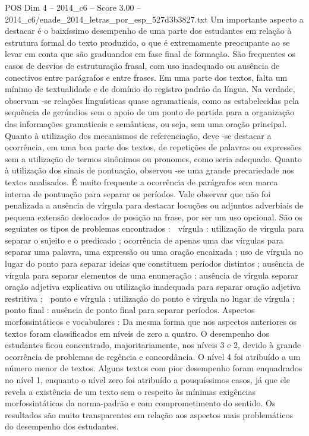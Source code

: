 \begin{textsample}{POS Dim 4 – 2014\_c6 – Score 3.00 – 2014\_c6/enade\_2014\_letras\_por\_esp\_527d3b3827.txt}
Um importante aspecto a destacar é o baixíssimo desempenho de uma parte dos estudantes em relação à estrutura formal do texto produzido, o que é extremamente preocupante ao se levar em conta que são graduandos em fase final de formação.
São frequentes os casos de desvios de estruturação frasal, com uso inadequado ou ausência de conectivos entre parágrafos e entre frases.
Em uma parte dos textos, falta um mínimo de textualidade e de domínio do registro padrão da língua.
Na verdade, observam -se relações linguísticas quase agramaticais, como as estabelecidas pela sequência de gerúndios sem o apoio de um ponto de partida para a organização das informações gramaticais e semânticas, ou seja, sem uma oração principal.
Quanto à utilização dos mecanismos de referenciação, deve -se destacar a ocorrência, em uma boa parte dos textos, de repetições de palavras ou expressões sem a utilização de termos sinônimos ou pronomes, como seria adequado.
Quanto à utilização dos sinais de pontuação, observou -se uma grande precariedade nos textos analisados.
É muito frequente a ocorrência de parágrafos sem marca interna de pontuação para separar os períodos.
Vale observar que não foi penalizada a ausência de vírgula para destacar locuções ou adjuntos adverbiais de pequena extensão deslocados de posição na frase, por ser um uso opcional.
São os seguintes os tipos de problemas encontrados :  vírgula : utilização de vírgula para separar o sujeito e o predicado ; ocorrência de apenas uma das vírgulas para separar uma palavra, uma expressão ou uma oração encaixada ; uso de vírgula no lugar do ponto para separar ideias que constituem períodos distintos ; ausência de vírgula para separar elementos de uma enumeração ; ausência de vírgula separar oração adjetiva explicativa ou utilização inadequada para separar oração adjetiva restritiva ;  ponto e vírgula : utilização do ponto e vírgula no lugar de vírgula ;  ponto final : ausência de ponto final para separar períodos.
Aspectos morfossintáticos e vocabulares : Da mesma forma que nos aspectos anteriores os textos foram classificados em níveis de zero a quatro.
O desempenho dos estudantes ficou concentrado, majoritariamente, nos níveis 3 e 2, devido à grande ocorrência de problemas de regência e concordância.
O nível 4 foi atribuído a um número menor de textos.
Alguns textos com pior desempenho foram enquadrados no nível 1, enquanto o nível zero foi atribuído a pouquíssimos casos, já que ele revela a existência de um texto sem o respeito às mínimas exigências morfossintáticas da norma-padrão e com comprometimento do sentido.
Os resultados são muito transparentes em relação aos aspectos mais problemáticos do desempenho dos estudantes.

\end{textsample}
